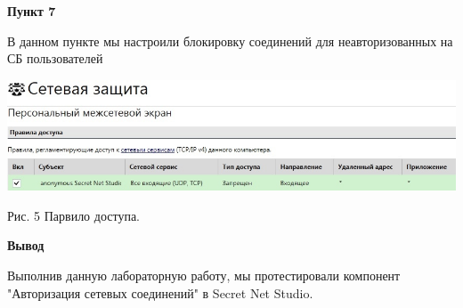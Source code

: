 \documentclass[a4paper,14pt]{extarticle}
\begin{document}
    \textbf{Пункт 7}
    \vspace{-3ex}
    \begin{center}
        \singlespacing
        В данном пункте мы настроили блокировку соединений для неавторизованных на СБ пользователей

        \includegraphics[scale=0.5]{pics/7.jpg}

        Рис. 5 Парвило доступа.
    \end{center}

    \textbf{Вывод}\par
    Выполнив данную лабораторную работу, мы протестировали компонент "Авторизация сетевых соединений" в Secret Net Studio. 
\end{document}
